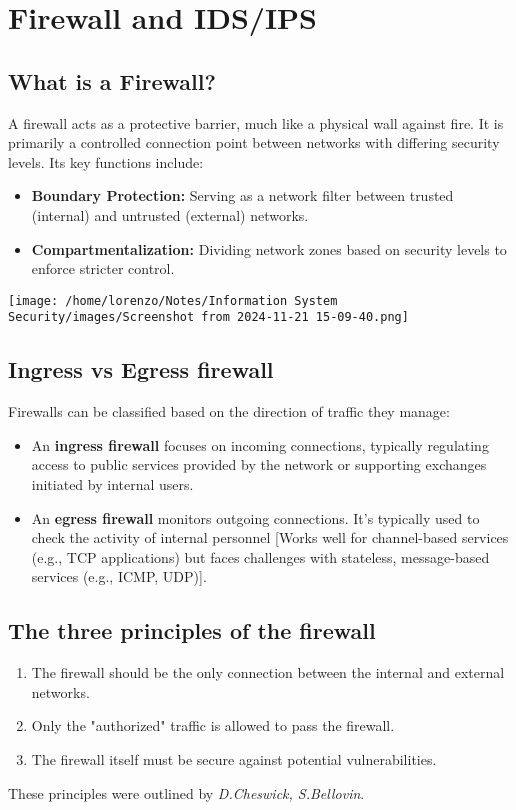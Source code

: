 \chapter{Firewall and IDS/IPS} 

\begin{minipage}{0.6\textwidth}
\section{What is a Firewall?}
A firewall acts as a protective barrier, much like a physical wall against fire. It is primarily a controlled connection point between networks with differing security levels. Its key functions include:
\begin{itemize}
    \item \textbf{Boundary Protection:} Serving as a network filter between trusted (internal) and untrusted (external) networks.
    \item \textbf{Compartmentalization:} Dividing network zones based on security levels to enforce stricter control.
\end{itemize}
\end{minipage} 
\hspace{0.5cm}
\begin{minipage}{0.4\textwidth}
    \centering
    \texttt{[image: /home/lorenzo/Notes/Information System Security/images/Screenshot from 2024-11-21 15-09-40.png]}
\end{minipage}

\section{Ingress vs Egress firewall}
Firewalls can be classified based on the direction of traffic they manage:
\begin{itemize}
    \item An \textbf{ingress firewall} focuses on incoming connections, typically regulating access to public services provided by the network or supporting exchanges initiated by internal users.
    \item An \textbf{egress firewall} monitors outgoing connections. It's typically used to check the activity of internal personnel [Works well for channel-based services (e.g., TCP applications) but faces challenges with stateless, message-based services (e.g., ICMP, UDP)].
\end{itemize}
\section{The three principles of the firewall}
\begin{enumerate}
    \item The firewall should be the only connection between the internal and external networks.
    \item Only the "authorized"  traffic is allowed to pass the firewall.
    \item The firewall itself must be secure against potential vulnerabilities.
\end{enumerate}
These principles were outlined by \textit{D.Cheswick, S.Bellovin}.

